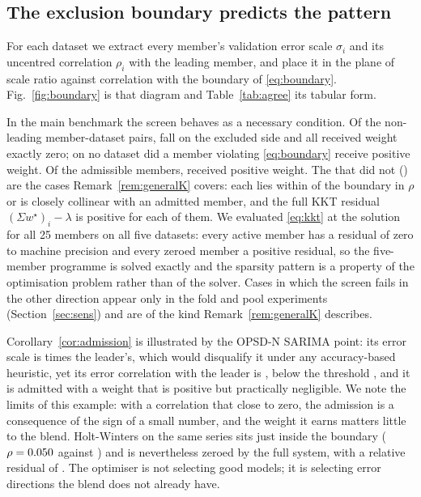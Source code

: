 \documentclass[journal]{IEEEtran}
\begin{document}
\subsection{The exclusion boundary predicts the pattern}
\label{sec:boundary}
For each dataset we extract every member's validation error scale $\sigma_i$ and its uncentred correlation $\rho_i$ with the leading member, and place it in the plane of scale ratio against correlation with the boundary of \eqref{eq:boundary}. Fig.~\ref{fig:boundary} is that diagram and Table~\ref{tab:agree} its tabular form.

In the main benchmark the screen behaves as a necessary condition. Of the \nNonLeading{} non-leading member-dataset pairs, \nExcluded{} fall on the excluded side and all \nExcluded{} received weight exactly zero; on no dataset did a member violating \eqref{eq:boundary} receive positive weight. Of the \nAdmissible{} admissible members, \nAdmPositive{} received positive weight. The \nAdmZero{} that did not (\collList) are the cases Remark~\ref{rem:generalK} covers: each lies within \collMaxGap{} of the boundary in $\rho$ or is closely collinear with an admitted member, and the full KKT residual $(\Sigma w^{\star})_i - \lambda$ is positive for each of them. We evaluated \eqref{eq:kkt} at the solution for all 25 members on all five datasets: every active member has a residual of zero to machine precision and every zeroed member a positive residual, so the five-member programme is solved exactly and the sparsity pattern is a property of the optimisation problem rather than of the solver. Cases in which the screen fails in the other direction appear only in the fold and pool experiments (Section~\ref{sec:sens}) and are of the kind Remark~\ref{rem:generalK} describes.

Corollary~\ref{cor:admission} is illustrated by the OPSD-N SARIMA point: its error scale is \sarimaOPSDNratio{} times the leader's, which would disqualify it under any accuracy-based heuristic, yet its error correlation with the leader is \sarimaOPSDNrho, below the threshold \sarimaOPSDNthr, and it is admitted with a weight that is positive but practically negligible. We note the limits of this example: with a correlation that close to zero, the admission is a consequence of the sign of a small number, and the weight it earns matters little to the blend. Holt-Winters on the same series sits just inside the boundary ($\rho = 0.050$ against \hwOPSDNthr) and is nevertheless zeroed by the full system, with a relative residual of \hwOPSDNkkt. The optimiser is not selecting good models; it is selecting error directions the blend does not already have.
\end{document}
